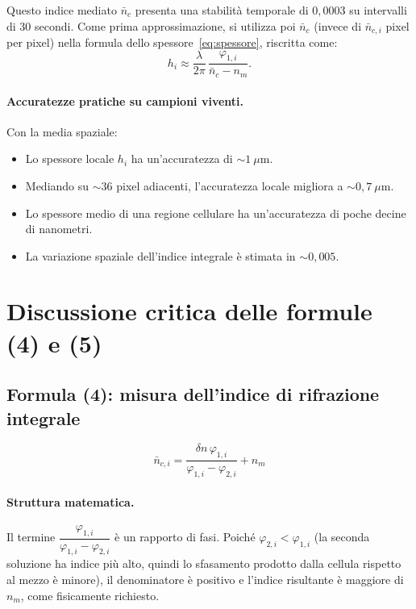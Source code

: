 Questo indice mediato $\bar{n}_c$ presenta una stabilità temporale di $0{,}0003$
su intervalli di 30 secondi. Come prima approssimazione, si utilizza poi $\bar{n}_c$
(invece di $\bar{n}_{c,i}$ pixel per pixel) nella formula dello spessore~\eqref{eq:spessore},
riscritta come:
\[
  h_i \approx \frac{\lambda}{2\pi}\,\frac{\varphi_{1,i}}{\bar{n}_c - n_m}.
\]

\paragraph{Accuratezze pratiche su campioni viventi.}
Con la media spaziale:
\begin{itemize}
  \item Lo spessore locale $h_i$ ha un'accuratezza di $\sim 1\ \mu\mathrm{m}$.
  \item Mediando su $\sim 36$ pixel adiacenti, l'accuratezza locale migliora a
        $\sim 0{,}7\ \mu\mathrm{m}$.
  \item Lo spessore medio di una regione cellulare ha un'accuratezza di poche
        decine di nanometri.
  \item La variazione spaziale dell'indice integrale è stimata in $\sim 0{,}005$.
\end{itemize}

\section{Discussione critica delle formule (4) e (5)}

\subsection{Formula (4): misura dell'indice di rifrazione integrale}

\begin{equation*}
  \bar{n}_{c,i}
  = \frac{\delta n\,\varphi_{1,i}}{\varphi_{1,i} - \varphi_{2,i}} + n_m
  \tag{4}
\end{equation*}

\paragraph{Struttura matematica.}
Il termine $\dfrac{\varphi_{1,i}}{\varphi_{1,i} - \varphi_{2,i}}$ è un rapporto
di fasi. Poiché $\varphi_{2,i} < \varphi_{1,i}$ (la seconda soluzione ha indice
più alto, quindi lo sfasamento prodotto dalla cellula rispetto al mezzo è minore),
il denominatore è positivo e l'indice risultante è maggiore di $n_m$, come
fisicamente richiesto.

